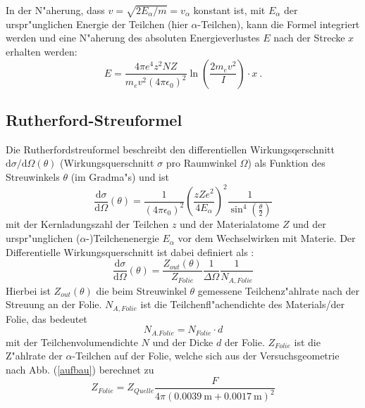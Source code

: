     In der N"aherung, dass $v=\sqrt{2E_{\alpha}/m}=v_{\alpha}$ konstant ist, mit $E_{\alpha}$ der urspr"unglichen Energie der Teilchen (hier $\alpha$-Teilchen), kann die Formel integriert werden und eine N"aherung des absoluten Energieverlustes $E$ nach der Strecke $x$ erhalten werden:
    \begin{equation}
      E = \frac{4\pi e^4z^2NZ}{m_ev^2(4\pi \epsilon_0)^2}\ln \left(\frac{2m_ev^2}{I}\right) \cdot x
      \label{bethe} \: .
    \end{equation}



  \subsection{Rutherford-Streuformel}
    Die Rutherfordstreuformel beschreibt den differentiellen Wirkungsqerschnitt $\text{d}\sigma/\text{d}\Omega(\theta)$ (Wirkungsquerschnitt $\sigma$ pro Raumwinkel $\Omega$) als Funktion des Streuwinkels $\theta$ (im Gradma"s) und ist
    \begin{equation}
      \frac{\text{d}\sigma}{\text{d}\Omega}(\theta) = \frac{1}{(4\pi \epsilon_0)^2} \left( \frac{zZe^2}{4E_{\alpha}} \right)^2 \frac{1}{\sin^4(\frac{\theta}{2})}
      \label{ruther}
    \end{equation}
    mit der Kernladungszahl der Teilchen $z$ und der Materialatome $Z$ und der urspr"unglichen ($\alpha$-)Teilchenenergie $E_{\alpha}$ vor dem Wechselwirken mit Materie.
    Der Differentielle Wirkungsquerschnitt ist dabei definiert als \cite{omega}:
    \begin{equation}
      \frac{\text{d}\sigma}{\text{d}\Omega}(\theta) = \frac{Z_{out}(\theta)}{Z_{Folie}} \frac{1}{\Delta \Omega} \frac{1}{N_{A,Folie}}
    \end{equation}
    Hierbei ist $Z_{out}(\theta)$ die beim Streuwinkel $\theta$ gemessene Teilchenz"ahlrate nach der Streuung an der Folie.
    $N_{A,Folie}$ ist die Teilchenfl"achendichte des Materials/der Folie, das bedeutet
    \begin{equation}
      N_{A.Folie} = N_{Folie} \cdot d
    \end{equation}
    mit der Teilchenvolumendichte $N$ und der Dicke $d$ der Folie.
    $Z_{Folie}$ ist die Z"ahlrate der $\alpha$-Teilchen auf der Folie, welche sich aus der Versuchsgeometrie nach Abb. (\ref{aufbau}) berechnet zu
    \begin{equation}
      Z_{Folie}=Z_{Quelle}\frac{F}{4\pi(\SI{0.0039}{\meter}+\SI{0,0017}{\meter})^2}
    \end{equation}
